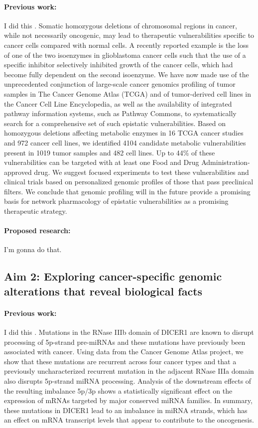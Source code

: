 \documentclass[12pt,letterpaper]{article}
\begin{document}
\paragraph{Previous work:} 
I did this \cite{aksoy2014prediction}.
Somatic homozygous deletions of chromosomal regions in cancer, while not necessarily oncogenic, may lead to therapeutic vulnerabilities specific to cancer cells compared with normal cells. 
A recently reported example is the loss of one of the two isoenzymes in glioblastoma cancer cells such that the use of a specific inhibitor selectively inhibited growth of the cancer cells, which had become fully dependent on the second isoenzyme. 
We have now made use of the unprecedented conjunction of large-scale cancer genomics profiling of tumor samples in The Cancer Genome Atlas (TCGA) and of tumor-derived cell lines in the Cancer Cell Line Encyclopedia, as well as the availability of integrated pathway information systems, such as Pathway Commons, to systematically search for a comprehensive set of such epistatic vulnerabilities. 
Based on homozygous deletions affecting metabolic enzymes in 16 TCGA cancer studies and 972 cancer cell lines, we identified 4104 candidate metabolic vulnerabilities present in 1019 tumor samples and 482 cell lines. 
Up to 44\% of these vulnerabilities can be targeted with at least one Food and Drug Administration-approved drug. 
We suggest focused experiments to test these vulnerabilities and clinical trials based on personalized genomic profiles of those that pass preclinical filters. 
We conclude that genomic profiling will in the future provide a promising basis for network pharmacology of epistatic vulnerabilities as a promising therapeutic strategy.

\paragraph{Proposed research:}
I'm gonna do that.

\subsection*{Aim 2: Exploring cancer-specific genomic alterations that reveal biological facts}
\paragraph{Previous work:}
I did this \cite{aksoy2014cancer}.
Mutations in the RNase IIIb domain of DICER1 are known to disrupt processing of 5p-strand pre-miRNAs and these mutations have previously been associated with cancer. 
Using data from the Cancer Genome Atlas project, we show that these mutations are recurrent across four cancer types and that a previously uncharacterized recurrent mutation in the adjacent RNase IIIa domain also disrupts 5p-strand miRNA processing. 
Analysis of the downstream effects of the resulting imbalance 5p/3p shows a statistically significant effect on the expression of mRNAs targeted by major conserved miRNA families. 
In summary, these mutations in DICER1 lead to an imbalance in miRNA strands, which has an effect on mRNA transcript levels that appear to contribute to the oncogenesis.
\end{document}
